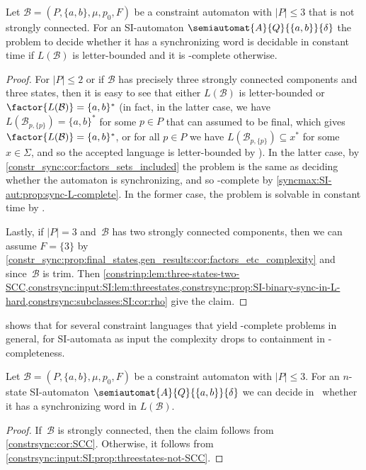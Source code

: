 \begin{proposition} \label{constrsync:input:SI:prop:threestates-not-SCC}
	Let $\mathcal B = (P, \{a,b\}, \mu, p_0, F)$
	be a constraint automaton with $|P| \le 3$
	that is not strongly connected.
	For an SI-automaton $\semiautomat{A}{Q}{\{a,b\}}{\delta}$
	the problem to decide whether it has a synchronizing
	word is decidable in constant time if $L(\mathcal B)$
	is letter-bounded and it is \LOGSPACE-complete
	otherwise.
\end{proposition}
\begin{proof}
	For $|P| \le 2$
	or if $\mathcal B$ has precisely three strongly connected components and three states,
	then it is easy to see that either $L(\mathcal B)$ is letter-bounded
	or $\factor{L(\mathcal B)} = \{a,b\}^*$ (in fact, in the latter case, 
	we have $L(\mathcal B_{p,\{p\}}) = \{a,b\}^*$
	for some $p \in P$ that can assumed to be final,
	which gives $\factor{L(\mathcal B)} = \{a,b\}^*$,
	or for all $p \in P$ we have $L(\mathcal B_{p,\{p\}}) \subseteq x^*$
	for some $x \in \Sigma$,
	and so the accepted language is letter-bounded by ).	
	In the latter case,
	by \cref{constr_sync:cor:factors_sets_included} 
	the problem is the same as deciding whether the automaton
	is synchronizing, and so \LOGSPACE-complete
	by \cref{syncmax:SI-aut:prop:sync-L-complete}.
	In the former case, the problem is solvable in constant time
	by .

	Lastly, if $|P| = 3$ and~$\mathcal B$
	has two strongly connected components,
	then we can assume $F = \{3\}$
	by \cref{constr_sync:prop:final_states,gen_results:cor:factors_etc_complexity}
	and since~$\mathcal B$ is trim.
	Then \cref{constrinp:lem:three-states-two-SCC,constrsync:input:SI:lem:threestates,constrsync:prop:SI-binary-sync-in-L-hard,constrsync:subclasses:SI:cor:rho} give the claim.	
\end{proof}

 shows that for several constraint languages
that yield \PSPACE-complete problems in general,
for SI-automata as input the complexity drops to containment in \LOGSPACE-completeness.

\begin{theorem}\label{constrsync:input:SI:thm:atmostthreestates}
		Let $\mathcal B = (P, \{a,b\}, \mu, p_0, F)$
		be a constraint automaton with $|P| \le 3$.
		For an $n$-state SI-automaton $\semiautomat{A}{Q}{\{a,b\}}{\delta}$
		we can decide in \NL\  whether it has a synchronizing word in $L(\mathcal B)$.
\end{theorem}
\begin{proof}
	If~$\mathcal B$ is strongly connected,
	then the claim follows from \cref{constrsync:cor:SCC}.
	Otherwise, it follows from \cref{constrsync:input:SI:prop:threestates-not-SCC}.
\end{proof}
